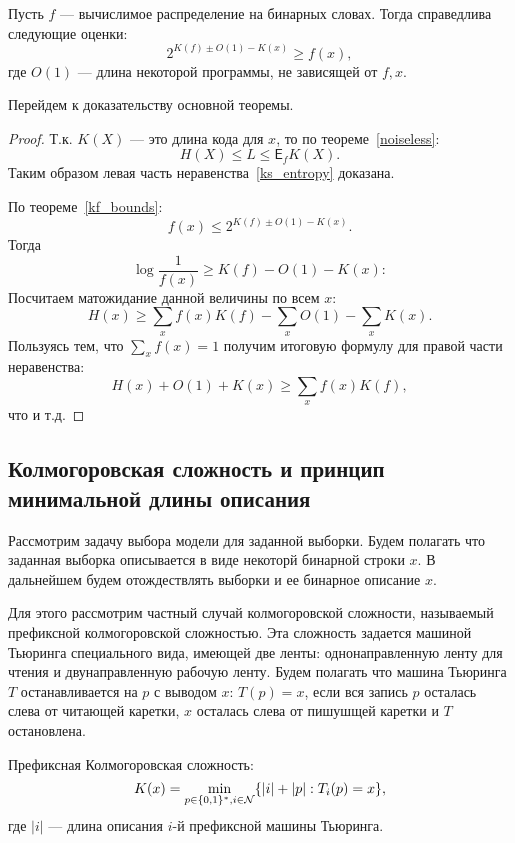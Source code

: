 \documentclass[../main.tex]{subfiles}
\begin{document}
\begin{theorembd}
\label{kf_bounds}
Пусть $f$ --- вычислимое распределение на бинарных словах. Тогда справедлива следующие оценки:
\[
	2^{K(f) \pm O(1) - K(x)} \geq f(x),
\]
где $O(1)$ ---  длина некоторой программы, не зависящей от $f, x$. 
\end{theorembd}

Перейдем к доказательству основной теоремы.
\begin{proof}
Т.к. $K(X)$ --- это длина кода для $x$, то по теореме~\ref{noiseless}:
\[
	H(X) \leq L \leq \mathsf{E}_f K(X).
\]
Таким образом левая часть неравенства~\eqref{ks_entropy}  доказана.

По теореме~\ref{kf_bounds}:
\[
	f(x) \leq 2^{K(f) \pm O(1) - K(x)}.
\]
Тогда
\[
	 \log\frac{1}{f(x)} \geq K(f) - O(1) - K(x):
\]
Посчитаем матожидание данной величины по всем $x$:
\[
	 H(x) \geq \sum_x f(x) K(f) - \sum_x O(1) - \sum_x K(x).
\]
Пользуясь тем, что $\sum_{x} f(x) = 1$ получим итоговую формулу для правой части неравенства:
\[
	 H(x)  +   O(1) +  K(x) \geq \sum_x f(x) K(f),
\]
что и т.д.
\end{proof}




\subsection{Колмогоровская сложность и принцип минимальной длины описания}
Рассмотрим задачу выбора модели для заданной выборки. Будем полагать что заданная выборка описывается в виде некоторй бинарной строки $x$. В дальнейшем будем отождествлять выборки и ее бинарное описание $x$.

Для этого рассмотрим частный случай колмогоровской сложности, называемый префиксной колмогоровской сложностью. Эта сложность задается машиной Тьюринга специального вида, имеющей две ленты: однонаправленную ленту для чтения и двунаправленную рабочую ленту. Будем полагать что машина Тьюринга $T$ останавливается на $p$ с выводом $x$: $T(p) = x$, если вся запись $p$ осталась слева от читающей каретки, $x$ осталась слева от пишушщей каретки и $T$ остановлена.

\begin{definition}
Префиксная Колмогоровская сложность:
\[
K(x) = \min_{p \in \{0,1\}^* ,i \in \mathcal{N}}\{|i|+|p|: T_i(p) = x\},
\]
где $|i|$ --- длина описания $i$-й префиксной машины Тьюринга.
\end{definition}
\end{document}
